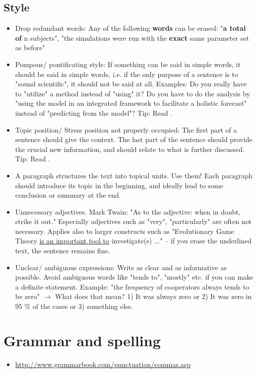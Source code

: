 \documentclass[justified, notoc]{tufte-book} %
\begin{document}
\begin{fullwidth}
\begin{appendices}
\subsection{Style}
\begin{itemize}
	\item Drop redundant words: Any of the following \textbf{words} can be erased: "\textbf{a total of} n subjects", "the simulations were run with the \textbf{exact} same parameter set as before"
	\item Pompous/ pontificating style: If something can be said in simple words, it should be said in simple words, i.e. if the only purpose of a sentence is to "sound scientific", it should not be said at all. Examples: Do you really have to "utilize" a method instead of "using" it? Do you have to do the analysis by "using the model in an integrated framework to facilitate a holistic forecast" instead of "predicting from the model"? Tip: Read \citet{Woodford1967}.
	\item Topic position/ Stress position not properly occupied: The first part of a sentence should give the context. The last part of the sentence should provide the crucial new information, and should relate to what is further discussed. Tip: Read \citet{Gopen1990}.
	\item A paragraph structures the text into topical units. Use them! Each paragraph should introduce its topic in the beginning, and ideally lead to some conclusion or summary at the end. 
	\item Unnecessary adjectives. Mark Twain: "As to the adjective: when in doubt, strike it out." Especially adjectives such as "very", "particularly" are often not necessary. Applies also to larger constructs such as "Evolutionary Game Theory \uline{is an important tool to} investigate(s) ..." -- if you erase the underlined text, the sentence remains fine.
	\item Unclear/ ambiguous expressions: Write as clear and as informative as possible. Avoid ambiguous words like "tends to", "mostly" etc. if you can make a definite statement. Example: "the frequency of cooperators always tends to be zero"  $\rightarrow$ What does that mean? 1) It was always zero or 2) It was zero in 95 \% of the cases or 3) something else.
\end{itemize}

\section{Grammar and spelling}
\begin{itemize}
	\item \url{http://www.grammarbook.com/punctuation/commas.asp}
\end{itemize}
\end{appendices}
\end{fullwidth}
\end{document}
